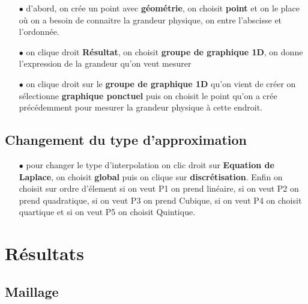 \documentclass[a4paper,11pt]{report} %
\begin{document}
\begin{itemize}
    \item[$\bullet$] d'abord, on crée un point avec \textbf{géométrie}, on choisit \textbf{point} et on le place où on a besoin de connaitre la grandeur physique, on entre l'abscisse et l'ordonnée.
    \item[$\bullet$]on clique droit \textbf{Résultat}, on choisit \textbf{groupe de graphique 1D}, on donne l'expression de la grandeur qu'on veut mesurer
    \item[$\bullet$]on clique droit sur le \textbf{groupe de graphique 1D} qu'on vient de créer on sélectionne \textbf{graphique ponctuel} puis on choisit le point qu'on a crée précédemment pour mesurer la grandeur physique à cette endroit.
\end{itemize}

\subsection{Changement du type d'approximation}

\begin{itemize}
    \item[$\bullet$]pour changer le type d'interpolation on clic droit sur \textbf{Equation de Laplace}, on choisit \textbf{global} puis on clique sur \textbf{discrétisation}. Enfin on choisit sur ordre d'élement si on veut P1 on prend linéaire, si on veut P2 on prend quadratique, si on veut P3 on prend Cubique, si on veut P4 on choisit quartique et si on veut P5 on choisit Quintique.

\end{itemize}


\section{Résultats}


\subsection{Maillage}
\end{document}
